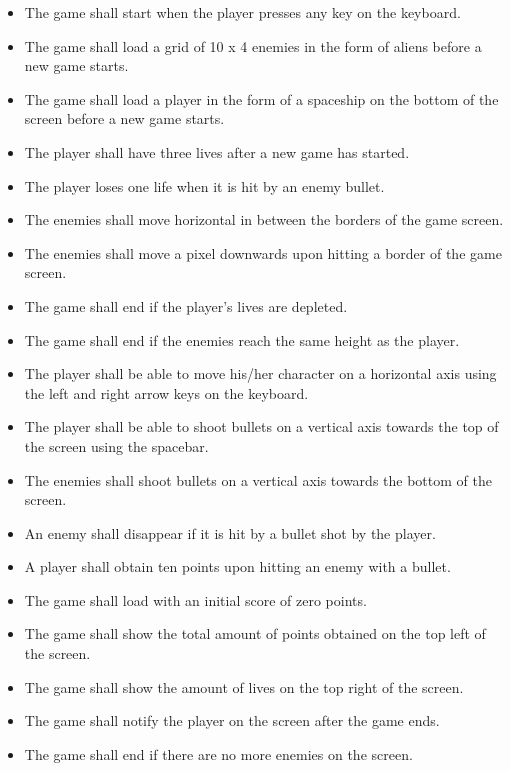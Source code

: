 \begin{itemize}
	\item The game shall start when the player presses any key on the keyboard.
	\item The game shall load a grid of 10 x 4 enemies in the form of aliens before a new game starts.
	\item The game shall load a player in the form of a spaceship on the bottom of the screen before a new game starts.
	\item The player shall have three lives after a new game has started.
	\item The player loses one life when it is hit by an enemy bullet.
	\item The enemies shall move horizontal in between the borders of the game screen.
	\item The enemies shall move a pixel downwards upon hitting a border of the game screen.
	\item The game shall end if the player's lives are depleted.
	\item The game shall end if the enemies reach the same height as the player.
	\item The player shall be able to move his/her character on a horizontal axis using the left and right arrow keys on the keyboard.
	\item The player shall be able to shoot bullets on a vertical axis towards the top of the screen using the spacebar.
	\item The enemies shall shoot bullets on a vertical axis towards the bottom of the screen.
	\item An enemy shall disappear if it is hit by a bullet shot by the player.
	\item A player shall obtain ten points upon hitting an enemy with a bullet.
	\item The game shall load with an initial score of zero points.
	\item The game shall show the total amount of points obtained on the top left of the screen.
	\item The game shall show the amount of lives on the top right of the screen.
	\item The game shall notify the player on the screen after the game ends.
	\item The game shall end if there are no more enemies on the screen.
\end{itemize}

